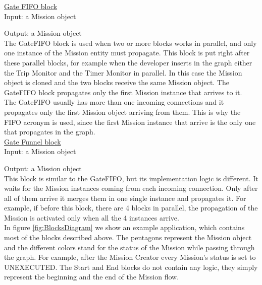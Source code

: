 \underline{Gate FIFO block}
\\

Input: a Mission object

Output: a Mission object
\\

The GateFIFO block is used when two or more blocks works in parallel, and only one instance of the Mission entity must propagate.
This block is put right after these parallel blocks, for example when the developer inserts in the graph either the Trip Monitor and the Timer Monitor in parallel. 
In this case the Mission object is cloned and the two blocks receive the same Mission object. 
The GateFIFO block propagates only the first Mission instance that arrives to it.
\\
The GateFIFO usually has more than one incoming connections and it propagates only the first Mission object arriving from them.
This is why the FIFO acronym is used, since the first Mission instance that arrive is the only one that propagates in the graph.
\\

\underline{Gate Funnel block}
\\

Input: a Mission object

Output: a Mission object
\\

This block is similar to the GateFIFO, but its implementation logic is different.
It waits for the Mission instances coming from each incoming connection.
Only after all of them arrive it merges them in one single instance and propagates it.
For example, if before this block, there are 4 blocks in parallel, the propagation of the Mission is activated only when all the 4 instances arrive.
\\

In figure \ref{fig:BlocksDiagram} we show an example application, which contains most of the blocks described above.
The pentagons represent the Mission object and the different colors stand for the status of the Mission while passing through the graph.
For example, after the Mission Creator every Mission's status is set to UNEXECUTED.
The Start and End blocks do not contain any logic, they simply represent the beginning and the end of the Mission flow.
\\

